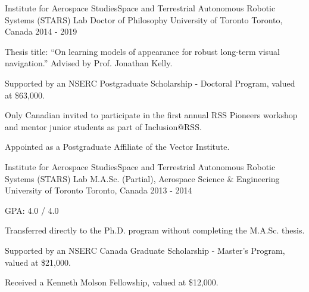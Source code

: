 

\begin{cventries}

  \cventry
    {Institute for Aerospace Studies{\enskip\cdotp\enskip}Space and Terrestrial Autonomous Robotic Systems (STARS) Lab} %
    {Doctor of Philosophy {\enskip\cdotp\enskip}University of Toronto} %
    {Toronto, Canada} %
    {2014 - 2019} %
    {
      \begin{cvitems} %
        \item {Thesis title: ``On learning models of appearance for robust long-term visual navigation.'' Advised by Prof. Jonathan Kelly.}
        \item {Supported by an NSERC Postgraduate Scholarship - Doctoral Program, valued at \$63,000.}
        \item {Only Canadian invited to participate in the first annual RSS Pioneers workshop and mentor junior students as part of Inclusion@RSS.}
        \item {Appointed as a Postgraduate Affiliate of the Vector Institute.}
      \end{cvitems}
    }

  \cventry
    {Institute for Aerospace Studies{\enskip\cdotp\enskip}Space and Terrestrial Autonomous Robotic Systems (STARS) Lab} %
    {M.A.Sc. (Partial), Aerospace Science \& Engineering {\enskip\cdotp\enskip}University of Toronto} %
    {Toronto, Canada} %
    {2013 - 2014} %
    {
      \begin{cvitems} %
        \item {GPA: 4.0 / 4.0}
        \item {Transferred directly to the Ph.D. program without completing the M.A.Sc. thesis.}
        \item {Supported by an NSERC Canada Graduate Scholarship - Master’s Program, valued at \$21,000.}
        \item {Received a Kenneth Molson Fellowship, valued at \$12,000.}
      \end{cvitems}
    }


\end{cventries}
